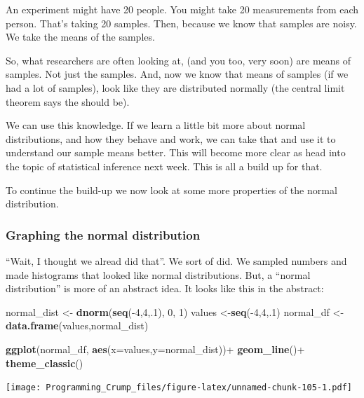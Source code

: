 \documentclass[]{book}
\newenvironment{Shaded}{\begin{snugshade}}{\end{snugshade}}
\newcommand{\KeywordTok}[1]{\textcolor[rgb]{0.13,0.29,0.53}{\textbf{{#1}}}}
\newcommand{\DataTypeTok}[1]{\textcolor[rgb]{0.13,0.29,0.53}{{#1}}}
\newcommand{\DecValTok}[1]{\textcolor[rgb]{0.00,0.00,0.81}{{#1}}}
\newcommand{\StringTok}[1]{\textcolor[rgb]{0.31,0.60,0.02}{{#1}}}
\newcommand{\NormalTok}[1]{{#1}}
\theoremstyle{definition}
\theoremstyle{definition}
\theoremstyle{definition}
\theoremstyle{remark}
\begin{document}
An experiment might have 20 people. You might take 20 measurements from
each person. That's taking 20 samples. Then, because we know that
samples are noisy. We take the means of the samples.

So, what researchers are often looking at, (and you too, very soon) are
means of samples. Not just the samples. And, now we know that means of
samples (if we had a lot of samples), look like they are distributed
normally (the central limit theorem says the should be).

We can use this knowledge. If we learn a little bit more about normal
distributions, and how they behave and work, we can take that and use it
to understand our sample means better. This will become more clear as
head into the topic of statistical inference next week. This is all a
build up for that.

To continue the build-up we now look at some more properties of the
normal distribution.

\subsubsection{Graphing the normal
distribution}\label{graphing-the-normal-distribution}

``Wait, I thought we alread did that''. We sort of did. We sampled
numbers and made histograms that looked like normal distributions. But,
a ``normal distribution'' is more of an abstract idea. It looks like
this in the abstract:

\begin{Shaded}
\begin{Highlighting}[]
\NormalTok{normal_dist <-}\StringTok{ }\KeywordTok{dnorm}\NormalTok{(}\KeywordTok{seq}\NormalTok{(-}\DecValTok{4}\NormalTok{,}\DecValTok{4}\NormalTok{,.}\DecValTok{1}\NormalTok{), }\DecValTok{0}\NormalTok{, }\DecValTok{1}\NormalTok{)}
\NormalTok{values <-}\KeywordTok{seq}\NormalTok{(-}\DecValTok{4}\NormalTok{,}\DecValTok{4}\NormalTok{,.}\DecValTok{1}\NormalTok{)}
\NormalTok{normal_df <-}\KeywordTok{data.frame}\NormalTok{(values,normal_dist)}

\KeywordTok{ggplot}\NormalTok{(normal_df, }\KeywordTok{aes}\NormalTok{(}\DataTypeTok{x=}\NormalTok{values,}\DataTypeTok{y=}\NormalTok{normal_dist))+}
\StringTok{  }\KeywordTok{geom_line}\NormalTok{()+}
\StringTok{  }\KeywordTok{theme_classic}\NormalTok{()}
\end{Highlighting}
\end{Shaded}

\texttt{[image: Programming\_Crump\_files/figure-latex/unnamed-chunk-105-1.pdf]}
\end{document}
